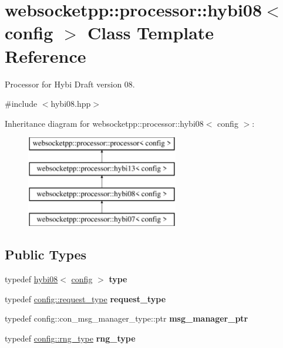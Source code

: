 \hypertarget{classwebsocketpp_1_1processor_1_1hybi08}{}\section{websocketpp\+:\+:processor\+:\+:hybi08$<$ config $>$ Class Template Reference}
\label{classwebsocketpp_1_1processor_1_1hybi08}


Processor for Hybi Draft version 08.  




{\ttfamily \#include $<$hybi08.\+hpp$>$}

Inheritance diagram for websocketpp\+:\+:processor\+:\+:hybi08$<$ config $>$\+:\begin{figure}[H]
\begin{center}
\leavevmode
\includegraphics[height=4.000000cm]{classwebsocketpp_1_1processor_1_1hybi08}
\end{center}
\end{figure}
\subsection*{Public Types}
\begin{DoxyCompactItemize}
\item 
typedef \hyperlink{classwebsocketpp_1_1processor_1_1hybi08}{hybi08}$<$ \hyperlink{classconfig}{config} $>$ {\bfseries type}\hypertarget{classwebsocketpp_1_1processor_1_1hybi08_adb295a175e3c45fad340b974c9daa780}{}\label{classwebsocketpp_1_1processor_1_1hybi08_adb295a175e3c45fad340b974c9daa780}

\item 
typedef \hyperlink{classwebsocketpp_1_1http_1_1parser_1_1request}{config\+::request\+\_\+type} {\bfseries request\+\_\+type}\hypertarget{classwebsocketpp_1_1processor_1_1hybi08_a5cb5a8054a9e10706e672de379284a2e}{}\label{classwebsocketpp_1_1processor_1_1hybi08_a5cb5a8054a9e10706e672de379284a2e}

\item 
typedef config\+::con\+\_\+msg\+\_\+manager\+\_\+type\+::ptr {\bfseries msg\+\_\+manager\+\_\+ptr}\hypertarget{classwebsocketpp_1_1processor_1_1hybi08_a4ad1477463712031772e8e8a48cdc7b0}{}\label{classwebsocketpp_1_1processor_1_1hybi08_a4ad1477463712031772e8e8a48cdc7b0}

\item 
typedef \hyperlink{classwebsocketpp_1_1random_1_1none_1_1int__generator}{config\+::rng\+\_\+type} {\bfseries rng\+\_\+type}\hypertarget{classwebsocketpp_1_1processor_1_1hybi08_af8b10cde566c24d29a94f50716fdcddd}{}\label{classwebsocketpp_1_1processor_1_1hybi08_af8b10cde566c24d29a94f50716fdcddd}

\end{DoxyCompactItemize}
